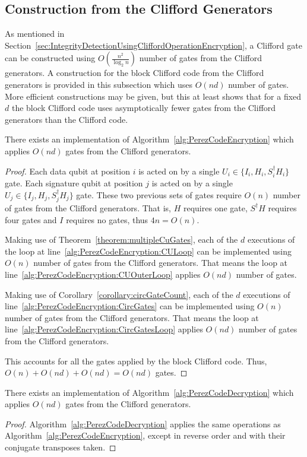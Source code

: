 \subsection{Construction from the Clifford Generators}
As mentioned in Section~\ref{sec:IntegrityDetectionUsingCliffordOperationEncryption}, a Clifford gate can be constructed using $O\left(\frac{n^2}{\log_2 n}\right)$ number of gates from the Clifford generators. A construction for the block Clifford code from the Clifford generators is provided in this subsection which uses $O(nd)$ number of gates. More efficient constructions may be given, but this at least shows that for a fixed $d$ the block Clifford code uses asymptotically fewer gates from the Clifford generators than the Clifford code.
\begin{theorem}
There exists an implementation of Algorithm~\ref{alg:PerezCodeEncryption} which applies $O \left(nd \right)$ gates from the Clifford generators.
\end{theorem}
\begin{proof}
Each data qubit at position $i$ is acted on by a single $U_i \in \{I_i, H_i, S_i^{\dagger}H_i\}$ gate. Each signature qubit at position $j$ is acted on by a single $U_j \in \{I_j, H_j, S_j^{\dagger}H_j\}$ gate. These two previous sets of gates require $O \left(n \right)$ number of gates from the Clifford generators. That is, $H$ requires one gate, $S^{\dagger}H$ requires four gates and $I$ requires no gates, thus $4n = O \left(n \right)$.

Making use of Theorem~\ref{theorem:multipleCuGates}, each of the $d$ executions of the loop at line~\ref{alg:PerezCodeEncryption:CULoop} can be implemented using $O \left(n \right)$ number of gates from the Clifford generators. That means the loop at line~\ref{alg:PerezCodeEncryption:CUOuterLoop} applies $O \left(nd \right)$ number of gates.

Making use of Corollary~\ref{corollary:circGateCount}, each of the $d$ executions of line~\ref{alg:PerezCodeEncryption:CircGates} can be implemented using $O \left(n \right)$ number of gates from the Clifford generators. That means the loop at line~\ref{alg:PerezCodeEncryption:CircGatesLoop} applies $O \left(nd \right)$ number of gates from the Clifford generators.

This accounts for all the gates applied by the block Clifford code. Thus, $O\left(n \right) + O\left(nd\right) + O\left(nd\right) = O\left(nd\right)$ gates.
\end{proof}

\begin{corollary}
There exists an implementation of Algorithm~\ref{alg:PerezCodeDecryption} which applies $O \left(nd \right)$ gates from the Clifford generators.
\end{corollary}
\begin{proof}
Algorithm~\ref{alg:PerezCodeDecryption} applies the same operations as Algorithm~\ref{alg:PerezCodeEncryption}, except in reverse order and with their conjugate transposes taken.
\end{proof}

